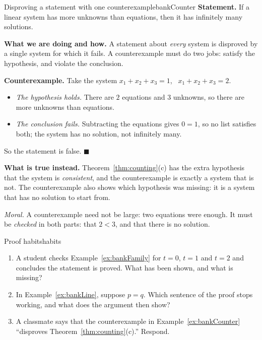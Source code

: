 \documentclass[11pt]{article}
\begin{document}
\begin{exmp}{Disproving a statement with one counterexample}{bankCounter}
\textbf{Statement.} If a linear system has more unknowns than equations, then it has infinitely many solutions.

\textbf{What we are doing and how.} A statement about \emph{every} system is disproved by a single system for which it fails. A counterexample must do two jobs: satisfy the hypothesis, and violate the conclusion.

\textbf{Counterexample.} Take the system $x_1+x_2+x_3=1$, \ $x_1+x_2+x_3=2$.
\begin{itemize}
  \item \emph{The hypothesis holds.} There are $2$ equations and $3$ unknowns, so there are more unknowns than equations.
  \item \emph{The conclusion fails.} Subtracting the equations gives $0=1$, so no list satisfies both; the system has no solution, not infinitely many.
\end{itemize}
So the statement is false. \qquad$\blacksquare$

\textbf{What is true instead.} Theorem~\ref{thm:counting}(c) has the extra hypothesis that the system is \emph{consistent}, and the counterexample is exactly a system that is not. The counterexample also shows which hypothesis was missing: it is a system that has no solution to start from.

\emph{Moral.} A counterexample need not be large: two equations were enough. It must be \emph{checked} in both parts: that $2<3$, and that there is no solution.
\end{exmp}

\begin{think}{Proof habits}{habits}
\begin{enumerate}[label=(\arabic*)]
  \item A student checks Example~\ref{ex:bankFamily} for $t=0$, $t=1$ and $t=2$ and concludes the statement is proved. What has been shown, and what is missing?
  \item In Example~\ref{ex:bankLine}, suppose $p=q$. Which sentence of the proof stops working, and what does the argument then show?
  \item A classmate says that the counterexample in Example~\ref{ex:bankCounter} ``disproves Theorem~\ref{thm:counting}(c).'' Respond.
\end{enumerate}
\end{think}
\end{document}
